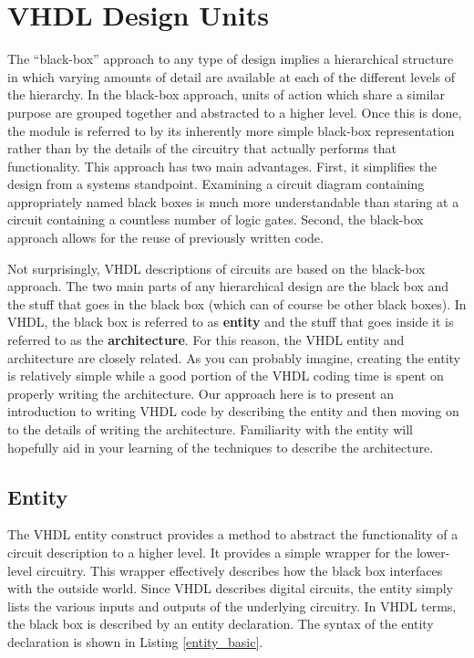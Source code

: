 %
%
%
\chapter{VHDL Design Units}
The ``black-box'' approach to any type of design implies a hierarchical structure in which varying amounts of detail are available at each of the different levels of the hierarchy. In the black-box approach, units of action which share a similar purpose are grouped together and abstracted to a higher level. Once this is done, the module is referred to by its inherently more simple black-box representation rather than by the details of the circuitry that actually performs that functionality. This approach has two main advantages. First, it simplifies the design from a systems standpoint. Examining a circuit diagram containing appropriately named black boxes is much more understandable than staring at a circuit containing a countless number of logic gates. Second, the black-box approach allows for the reuse of previously written code.

Not surprisingly, VHDL descriptions of circuits are based on the black-box approach. The two main parts of any hierarchical design are the black box and the stuff that goes in the black box (which can of course be other black boxes). In VHDL, the black box is referred to as \textbf{entity} and the stuff that goes inside it is referred to as the \textbf{architecture}. For this reason, the VHDL entity and architecture are closely related. As you can probably imagine, creating the entity is relatively simple while a good portion of the VHDL coding time is spent on properly writing the architecture. Our approach here is to present an introduction to writing VHDL code by describing the entity and then moving on to the details of writing the architecture. Familiarity with the entity will hopefully aid in your learning of the techniques to describe the architecture.

\section{Entity}
The VHDL entity construct provides a method to abstract the functionality of a circuit description to a higher level. It provides a simple wrapper for the lower-level circuitry. This wrapper effectively describes how the black box interfaces with the outside world. Since VHDL describes digital circuits, the entity simply lists the various inputs and outputs of the underlying circuitry. In VHDL terms, the black box is described by an entity declaration. The syntax of the entity declaration is shown in Listing \ref{entity_basic}.

